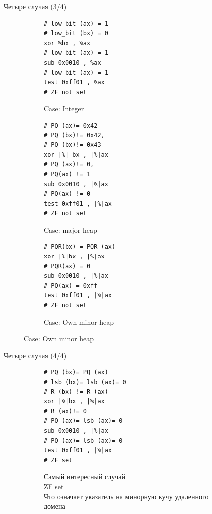 \documentclass[aspectratio=169
  , xcolor={svgnames} 
  , hyperref={ colorlinks,citecolor=DeepPink4
             , linkcolor=DarkRed,urlcolor=DarkBlue}
  , russian
  ]{beamer}
\theoremstyle{exerciseStyle1}
\begin{document}
\begin{frame}[fragile]{Четыре случая (3/4)}
\begin{figure}[ht]
\begin{subfigure}{.3\textwidth}
\begin{verbatim}
# low_bit (ax) = 1 
# low_bit (bx) = 0
xor %bx , %ax
# low_bit (ax) = 1
sub 0x0010 , %ax
# low_bit (ax) = 1 
test 0xff01 , %ax
# ZF not set 
\end{verbatim}
\caption{Case: Integer}
\end{subfigure}
\begin{subfigure}{.3\textwidth}
\begin{verbatim}
# PQ (ax)= 0x42 
# PQ (bx)!= 0x42, 
# PQ (bx)!= 0x43 
xor |%| bx , |%|ax
# PQ (ax)!= 0,
# PQ(ax) != 1 
sub 0x0010 , |%|ax
# PQ(ax) != 0 
test 0xff01 , |%|ax
# ZF not set 
\end{verbatim}
\caption{Case:  major heap}
\end{subfigure}
\begin{subfigure}{.3\textwidth}
\begin{verbatim}
# PQR(bx) = PQR (ax)
xor |%|bx , |%|ax
# PQR(ax) = 0 
sub 0x0010 , |%|ax
# PQ(ax) = 0xff 
test 0xff01 , |%|ax
# ZF not set 
\end{verbatim}
\caption{Case: Own minor heap}
\end{subfigure}
\end{figure}
\end{frame}

\begin{frame}[fragile]{Четыре случая (4/4)}
\begin{figure}[ht]
\begin{subfigure}{.49\textwidth}
\begin{verbatim}
# PQ (bx)= PQ (ax)
# lsb (bx)= lsb (ax)= 0 
# R (bx) != R (ax)
xor |%|bx , |%|ax
# R (ax)!= 0 
# PQ (ax)= lsb (ax)= 0 
sub 0x0010 , |%|ax
# PQ (ax)= lsb (ax)= 0 
test 0xff01 , |%|ax
# ZF set  
\end{verbatim}

\end{subfigure}
\begin{subfigure}{.49\textwidth}
Самый интересный случай\\
ZF set \\
Что означает указатель на минорную кучу удаленного домена
\end{subfigure}
\end{figure}
\end{frame}
\end{document}
